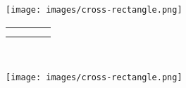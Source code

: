 \documentclass[10pt,]{article}
\theoremstyle{plain}
\theoremstyle{definition}
\theoremstyle{definition}
\theoremstyle{definition}
\theoremstyle{definition}
\theoremstyle{definition}
\theoremstyle{definition}
\numberwithin{equation}{section}
\newlength{\panelmax}
\begin{document}
\begin{figure}
{\begin{lrbox}{\panelboxDimage}
\texttt{[image: images/cross-rectangle.png]}
\end{lrbox}
\ifdefined\phDimage\else\newlength{\phDimage}\fi%
\setlength{\phDimage}{\ht\panelboxDimage+\dp\panelboxDimage}
\settototalheight{\phDimage}{\usebox{\panelboxDimage}}
\setlength{\panelmax}{\maxof{\panelmax}{\phDimage}}
\leavevmode%
\setlength{\tabcolsep}{0.025\linewidth}
\par\medskip\noindent
\hspace*{0.025\linewidth}%
\begin{tabular}{@{}*{4}{c}@{}}
\begin{minipage}[c][\panelmax][t]{0.2\linewidth}\usebox{\panelboxAimage}\end{minipage}&
\begin{minipage}[c][\panelmax][t]{0.2\linewidth}\usebox{\panelboxBimage}\end{minipage}&
\begin{minipage}[c][\panelmax][t]{0.2\linewidth}\usebox{\panelboxCimage}\end{minipage}&
\begin{minipage}[c][\panelmax][t]{0.2\linewidth}\usebox{\panelboxDimage}\end{minipage}\tabularnewline
\parbox[t]{0.2\linewidth}{\subcaption{\label{figure-93}}
}&
\parbox[t]{0.2\linewidth}{\subcaption{\label{figure-94}}
}&
\parbox[t]{0.2\linewidth}{\subcaption{\label{figure-95}}
}&
\parbox[t]{0.2\linewidth}{\subcaption{\label{figure-96}}
}\end{tabular}\\
}%
{%
\setlength{\panelmax}{0pt}
\ifdefined\panelboxAimage\else\newsavebox{\panelboxAimage}\fi%
\begin{lrbox}{\panelboxAimage}
\texttt{[image: images/cross-rectangle.png]}
\end{lrbox}
\ifdefined\phAimage\else\newlength{\phAimage}\fi%
\setlength{\phAimage}{\ht\panelboxAimage+\dp\panelboxAimage}
\settototalheight{\phAimage}{\usebox{\panelboxAimage}}
\setlength{\panelmax}{\maxof{\panelmax}{\phAimage}}
\ifdefined\panelboxBimage\else\newsavebox{\panelboxBimage}\fi%
\begin{lrbox}{\panelboxBimage}

\end{lrbox}}
\end{figure}
\end{document}

